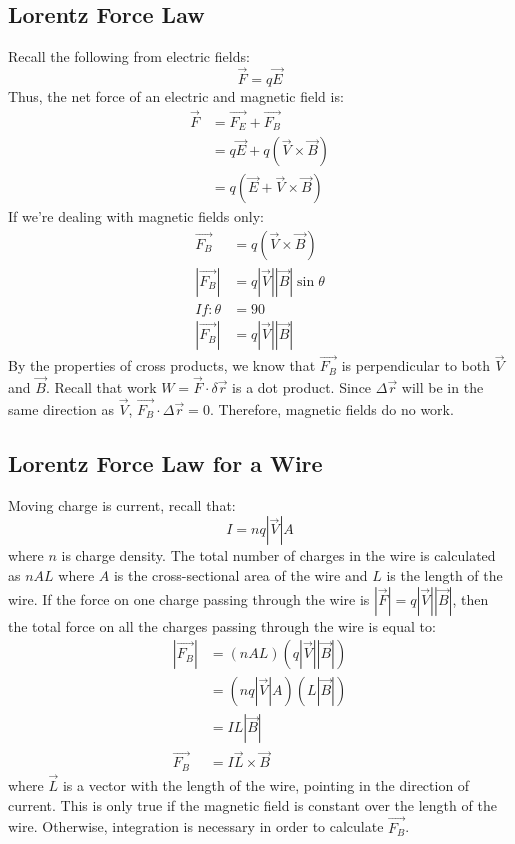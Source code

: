 \documentclass{math}
\begin{document}
\subsection*{Lorentz Force Law}
Recall the following from electric fields:
\[ \vec{F} = q\vec{E} \]
Thus, the net force of an electric and magnetic field is:
\begin{align*}
  \vec{F} &= \overrightarrow{F_E}+\overrightarrow{F_B} \\
  &= q\vec{E}+q(\vec{V}\times\vec{B}) \\
  &= q(\vec{E}+\vec{V}\times\vec{B})
\end{align*}
If we're dealing with magnetic fields only:
\begin{align*}
  \overrightarrow{F_B} &= q(\vec{V}\times\vec{B}) \\
  |\overrightarrow{F_B}| &= q|\vec{V}||\vec{B}|\sin\theta \\
  If: \theta &= 90 \\
  |\overrightarrow{F_B}| &= q|\vec{V}||\vec{B}|
\end{align*}
By the properties of cross products, we know that \( \overrightarrow{F_B} \) is
perpendicular to both \( \vec{V} \) and \( \vec{B} \). Recall that work
\( W = \vec{F}\cdot\delta\vec{r} \) is a dot product. Since \( \Delta\vec{r} \)
will be in the same direction as \( \vec{V} \),
\( \overrightarrow{F_B}\cdot\Delta\vec{r} = 0 \). Therefore, magnetic fields do
no work.

\subsection*{Lorentz Force Law for a Wire}
Moving charge is current, recall that:
\[ I = nq|\vec{V}|A \]
where \( n \) is charge density. The total number of charges in the wire
is calculated as \( nAL \) where \( A \) is the cross-sectional area of the wire
and \( L \) is the length of the wire. If the force on one charge passing
through the wire is \( |\vec{F}| = q|\vec{V}||\vec{B}| \), then the total force
on all the charges passing through the wire  is equal to:
\begin{align*}
  |\vec{F_B}| &= (nAL)(q|\vec{V}||\vec{B}|) \\
  &= (nq|\vec{V}|A)(L|\vec{B}|) \\
  &= IL|\vec{B}| \\
  \vec{F_B} &= I\vec{L}\times\vec{B}
\end{align*}
where \( \vec{L} \) is a vector with the length of the wire, pointing in the
direction of current. This is only true if the magnetic field is constant over
the length of the wire. Otherwise, integration is necessary in order to
calculate \( \vec{F_B} \).
\end{document}
